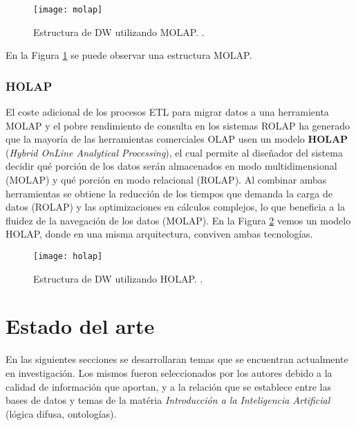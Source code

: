 \documentclass[a4paper,11pt]{article}
\begin{document}
    \begin{figure}
      \begin{center}
        \texttt{[image: molap]}
        \caption{Estructura de DW utilizando MOLAP. \cite[p.~81]{nagabhushana}.}
        \label{molap}
      \end{center}
    \end{figure}
    
    En la Figura \ref{molap} se puede observar una estructura MOLAP.
    
    \subsubsection{HOLAP}

    El coste adicional de los procesos ETL para migrar datos a una herramienta MOLAP y el pobre rendimiento de consulta en los sistemas ROLAP ha generado que la
    mayoría de las herramientas comerciales OLAP usen un modelo \textbf{HOLAP} (\textit{Hybrid OnLine Analytical Processing}), el cual permite al diseñador del sistema
    decidir qué porción de los datos serán almacenados en modo multidimensional (MOLAP) y qué porción en modo relacional (ROLAP). Al combinar ambas herramientas
    se obtiene la reducción de los tiempos que demanda la carga de datos (ROLAP) y las optimizaciones en cálculos complejos, lo que beneficia a la fluidez de la
    navegación de los datos (MOLAP). En la Figura \ref{holap} vemos un modelo HOLAP, donde en una misma arquitectura, conviven ambas tecnologías.
    
    \begin{figure}
      \begin{center}
        \texttt{[image: holap]}
        \caption{Estructura de DW utilizando HOLAP. \cite[p.~82]{nagabhushana}.}
        \label{holap}
      \end{center}
    \end{figure}


  
    \section{Estado del arte}
    
    En las siguientes secciones se desarrollaran temas que se encuentran actualmente en investigación. Los mismos fueron seleccionados por los autores
    debido a la calidad de información que aportan, y a la relación que se establece entre las bases de datos y temas de la matéria
    \textit{Introducción a la Inteligencia Artificial} (lógica difusa, ontologías).
    
\end{document}
